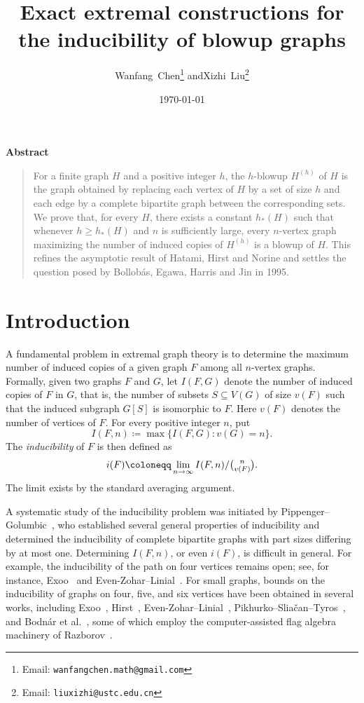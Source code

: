 \documentclass[10pt]{article}
\title{Exact extremal constructions for the inducibility of blowup graphs}
\author{Wanfang~Chen\thanks{Email: \texttt{wanfangchen.math@gmail.com}}
  \quad and\quad Xizhi~Liu\thanks{Email: \texttt{liuxizhi@ustc.edu.cn}}}
\affil{\small School of Mathematical Sciences, University of Science and Technology of China, Hefei, China}
\date{\today}
\makeatletter
\theoremstyle{plain}
\theoremstyle{remark}
\renewcommand{\maketitle}{%
  \par
  \begingroup
    \renewcommand\thefootnote{\@fnsymbol\c@footnote}%
    \def\@makefnmark{\rlap{\@textsuperscript{\normalfont\@thefnmark}}}%
    \long\def\@makefntext##1{\parindent 1em\noindent
      \hb@xt@1.8em{\hss\@textsuperscript{\normalfont\@thefnmark}}##1}%
    \begin{center}
      \let\footnote\thanks
      {\Large\bfseries \@title\par}
      \vspace{0.6em}
      {\normalsize \@author\par}
      \vspace{0.4em}
      {\normalsize \@date\par}
    \end{center}
    \@thanks
  \endgroup
  \setcounter{footnote}{0}%
  \vspace{0.8em}
}
\renewenvironment{abstract}{%
  \begin{center}\bfseries Abstract\end{center}
  \begin{quote}\small\noindent\ignorespaces
}{%
  \end{quote}\vspace{0.6em}
}
\makeatother
\begin{document}
\maketitle

\begin{abstract}
For a finite graph $H$ and a positive integer $h$, the $h$-blowup $H^{(h)}$ of $H$ is the graph obtained by replacing each vertex of $H$ by a set of size $h$ and each edge by a complete bipartite graph between the corresponding sets. We prove that, for every $H$, there exists a constant $h_*(H)$ such that whenever $h\ge h_*(H)$ and $n$ is sufficiently large, every $n$-vertex graph maximizing the number of induced copies of $H^{(h)}$ is a blowup of $H$. This refines the asymptotic result of Hatami, Hirst and Norine and settles the question posed by Bollob\'as, Egawa, Harris and Jin in 1995.
\end{abstract}

\section{Introduction}
\label{sec:introduction}

A fundamental problem in extremal graph theory is to determine the maximum number of induced copies of a given graph $F$ among all $n$-vertex graphs. Formally, given two graphs $F$ and $G$, let $I(F,G)$ denote the number of induced copies of $F$ in $G$, that is, the number of subsets $S\subseteq V(G)$ of size $v(F)$ such that the induced subgraph $G[S]$ is isomorphic to $F$. Here $v(F)$ denotes the number of vertices of $F$. For every positive integer $n$, put
\[
        I(F,n)\coloneqq \max\{I(F,G):v(G)=n\}.
\]
The \emph{inducibility} of $F$ is then defined as
\[
        i(F)\coloneqq\lim_{n\to\infty}{I(F,n)}/{\tbinom{n}{v(F)}}.
\]
The limit exists by the standard averaging argument.

A systematic study of the inducibility problem was initiated by Pippenger--Golumbic~\cite{PippengerGolumbic}, who established several general properties of inducibility and determined the inducibility of complete bipartite graphs with part sizes differing by at most one. Determining $I(F,n)$, or even $i(F)$, is difficult in general. For example, the inducibility of the path on four vertices remains open; see, for instance, Exoo~\cite{Exoo} and Even-Zohar--Linial~\cite{EvenZoharLinial}. For small graphs, bounds on the inducibility of graphs on four, five, and six vertices have been obtained in several works, including Exoo~\cite{Exoo}, Hirst~\cite{HirstFourVertices}, Even-Zohar--Linial~\cite{EvenZoharLinial}, Pikhurko--Slia{\v c}an--Tyros~\cite{Sliacan19}, and Bodn\'ar et al.~\cite{BGLLPS26}, some of which employ the computer-assisted flag algebra machinery of Razborov~\cite{Raz07}.
\end{document}
